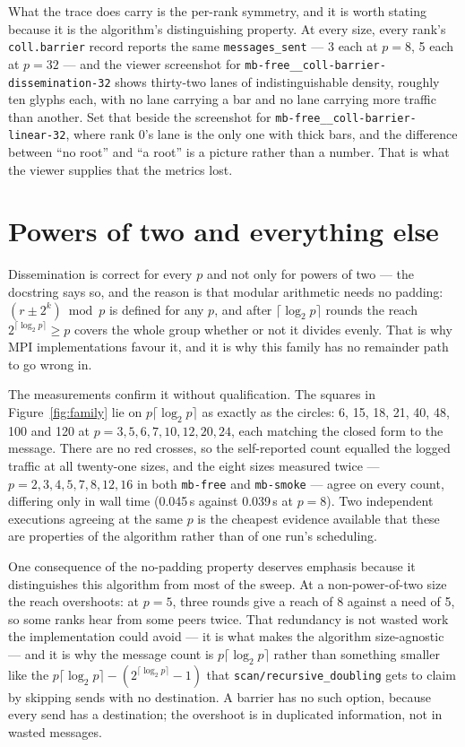 \documentclass[11pt]{article}
\begin{document}
What the trace does carry is the per-rank symmetry, and it is worth stating because it is the
algorithm's distinguishing property. At every size, every rank's \texttt{coll.barrier} record
reports the same \texttt{messages\_sent} --- 3 each at $p=8$, 5 each at $p=32$ --- and the
viewer screenshot for \texttt{mb-free\_\_coll-barrier-dissemination-32} shows thirty-two lanes
of indistinguishable density, roughly ten glyphs each, with no lane carrying a bar and no lane
carrying more traffic than another. Set that beside the screenshot for
\texttt{mb-free\_\_coll-barrier-linear-32}, where rank 0's lane is the only one with thick bars,
and the difference between ``no root'' and ``a root'' is a picture rather than a number. That
is what the viewer supplies that the metrics lost.

\section{Powers of two and everything else}

Dissemination is correct for every $p$ and not only for powers of two --- the docstring says so,
and the reason is that modular arithmetic needs no padding: $(r \pm 2^k) \bmod p$ is defined for
any $p$, and after $\lceil\log_2 p\rceil$ rounds the reach $2^{\lceil\log_2 p\rceil} \geq p$
covers the whole group whether or not it divides evenly. That is why MPI implementations favour
it, and it is why this family has no remainder path to go wrong in.

The measurements confirm it without qualification. The squares in Figure~\ref{fig:family} lie
on $p\lceil\log_2 p\rceil$ as exactly as the circles: 6, 15, 18, 21, 40, 48, 100 and 120 at
$p = 3, 5, 6, 7, 10, 12, 20, 24$, each matching the closed form to the message. There are no red
crosses, so the self-reported count equalled the logged traffic at all twenty-one sizes, and the
eight sizes measured twice --- $p = 2, 3, 4, 5, 7, 8, 12, 16$ in both \texttt{mb-free} and
\texttt{mb-smoke} --- agree on every count, differing only in wall time (0.045\,s against
0.039\,s at $p=8$). Two independent executions agreeing at the same $p$ is the cheapest evidence
available that these are properties of the algorithm rather than of one run's scheduling.

One consequence of the no-padding property deserves emphasis because it distinguishes this
algorithm from most of the sweep. At a non-power-of-two size the reach overshoots: at $p=5$,
three rounds give a reach of 8 against a need of 5, so some ranks hear from some peers twice.
That redundancy is not wasted work the implementation could avoid --- it is what makes the
algorithm size-agnostic --- and it is why the message count is $p\lceil\log_2 p\rceil$ rather
than something smaller like the $p\lceil\log_2 p\rceil - (2^{\lceil\log_2 p\rceil} - 1)$ that
\texttt{scan/recursive\_doubling} gets to claim by skipping sends with no destination. A barrier
has no such option, because every send has a destination; the overshoot is in duplicated
information, not in wasted messages.
\end{document}
